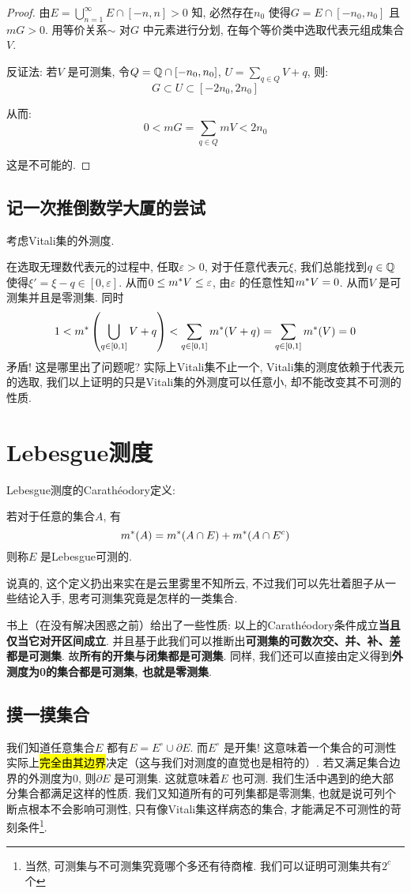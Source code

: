 \begin{proof}
    由\(E= \bigcup_{n=1}^{\infty} E\cap [-n,n]>0\) 知,
    必然存在\(n_{0}\) 使得\(G=E\cap [-n_{0},n_{0}]\) 且\(mG>0\).
    用等价关系\(\sim\) 对\(G\) 中元素进行分划, 在每个等价类中选取代表元组成集合\(V\).

    反证法: 若\(V\) 是可测集, 令\(Q=\mathbb{Q}\cap[-n_{0},n_{0}]\),
    \(U=\sum_{q\in Q} V+q\), 则:
    \[
        G \subset U \subset [-2n_{0},2n_{0}]
    \]

    从而: \[
        0<m G=\sum_{q\in Q} mV<2n_{0}
    \]

    这是不可能的.
\end{proof}

\subsection{记一次推倒数学大厦的尝试}
考虑Vitali集的外测度.

在选取无理数代表元的过程中, 任取\(\varepsilon>0\), 对于任意代表元\(\xi\),
我们总能找到\(q \in \mathbb{Q}\) 使得\(\xi'=\xi-q \in [0,\varepsilon]\).
从而\(0\leq m^{*} V\leq \varepsilon\), 由\(\varepsilon\)
的任意性知\(m^{*} V=0\). 从而\(V\) 是可测集并且是零测集. 同时\[
    1<m^{*}\left( \bigcup_{q\in [0,1]} V+q  \right) < \sum_{q
    \in [0,1]} m^{*}(V+q) = \sum_{q\in [0,1]} m^{*}(V) = 0
\]
矛盾!
这是哪里出了问题呢? 实际上Vitali集不止一个, Vitali集的测度依赖于代表元的选取,
我们以上证明的只是Vitali集的外测度可以任意小, 却不能改变其不可测的性质.

\section{Lebesgue测度}
Lebesgue测度的Carathéodory定义:
\begin{definition}
    若对于任意的集合\(A\), 有
    \[
        m^{*}(A)=m^{*}(A\cap E)+m^{*}(A\cap E^{c})
    \]
    则称\(E\) 是Lebesgue可测的.
\end{definition}

说真的, 这个定义扔出来实在是云里雾里不知所云, 不过我们可以先壮着胆子从一些结论入手, 思考可测集究竟是怎样的一类集合.

书上（在没有解决困惑之前）给出了一些性质: 以上的Carathéodory条件成立\textbf{当且仅当它对开区间成立}.
并且基于此我们可以推断出\textbf{可测集的可数次交、并、补、差都是可测集}. 故\textbf{所有的开集与闭集都是可测集}.
同样, 我们还可以直接由定义得到\textbf{外测度为0的集合都是可测集, 也就是零测集}.

\subsection{摸一摸集合}
我们知道任意集合\(E\) 都有\(E=E^{\circ} \cup \partial E\).
而\(E^{\circ}\) 是开集!
这意味着一个集合的可测性实际上\hl{完全由其边界}决定（这与我们对测度的直觉也是相符的）. 若又满足集合边界的外测度为0,
则\(\partial E\) 是可测集. 这就意味着\(E\) 也可测.
我们生活中遇到的绝大部分集合都满足这样的性质. 我们又知道所有的可列集都是零测集,
也就是说可列个断点根本不会影响可测性, 只有像Vitali集这样病态的集合,
才能满足不可测性的苛刻条件\footnote{当然, 可测集与不可测集究竟哪个多还有待商榷.
我们可以证明可测集共有\(2^{c}\) 个}.

